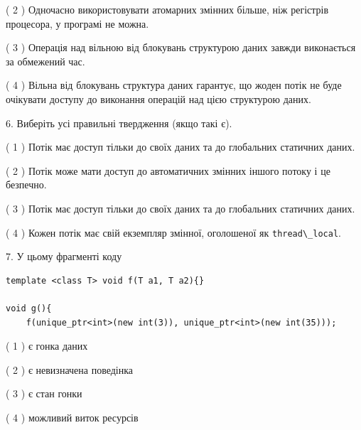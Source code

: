 \documentclass[12pt, ukrainian]{article}
\def\code#1{\Verb!#1!}
\begin{document}
\begin {large}
{( 2 ) Одночасно використовувати атомарних змінних більше, ніж регістрів процесора, у програмі не можна.%

( 3 ) Операція над вільною від блокувань структурою даних завжди виконається за обмежений час.%

( 4 ) Вільна від блокувань структура даних гарантує, що жоден потік не буде очікувати доступу до виконання операцій над цією структурою даних.%
\newpage



\vspace{5mm}
6. Виберіть усі правильні твердження (якщо такі є).\par
\vspace{2mm}

( 1 ) Потік має доступ тільки до своїх даних та до глобальних статичних даних.%

( 2 ) Потік може мати доступ до автоматичних змінних іншого потоку і це безпечно.%

( 3 ) Потік має доступ тільки до своїх даних та до глобальних статичних даних.%

( 4 ) Кожен потік має свій екземпляр змінної, оголошеної як \code{thread\_local}.%


\vspace{5mm}
7. У цьому фрагменті коду
\begin{verbatim}
template <class T> void f(T a1, T a2){}

void g(){
    f(unique_ptr<int>(new int(3)), unique_ptr<int>(new int(35)));
\end{verbatim}

( 1 ) є гонка даних%

( 2 ) є невизначена поведінка%

( 3 ) є стан гонки%

( 4 ) можливий виток ресурсів%
}
\end {large}
\end{document}
